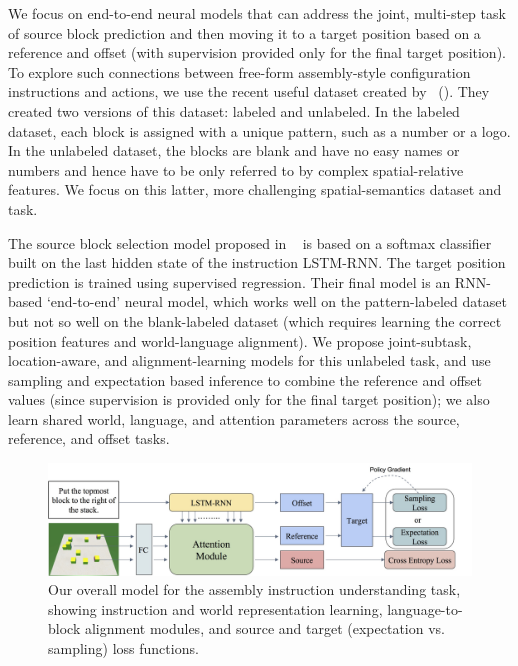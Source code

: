 \documentclass[letterpaper]{article} %
\newcommand{\newcite}[1]{\citeauthor{#1} (\citeyear{#1})}
\begin{document}
We focus on end-to-end neural models that can address the joint, multi-step task of source block prediction and then moving it to a target position based on a reference and offset (with supervision provided only for the final target position). To explore such connections between free-form assembly-style configuration instructions and  actions, we use the recent useful dataset created by~\newcite{bisk2016natural}. They created two versions of this dataset: labeled and unlabeled. In the labeled dataset, each block is assigned with a unique pattern, such as a number or a logo. In the unlabeled dataset, the blocks are blank and have no easy names or numbers and hence have to be only referred to by complex spatial-relative features. We focus on this latter, more challenging spatial-semantics dataset and task.

The source block selection model proposed in ~\cite{bisk2016natural} is based on a softmax classifier built on the last hidden state of the instruction LSTM-RNN. The target position prediction is trained using supervised regression.  Their final model is an RNN-based `end-to-end' neural model, which works well on the pattern-labeled dataset but not so well on the blank-labeled dataset (which requires learning the correct position features and world-language alignment). We propose joint-subtask, location-aware, and alignment-learning models for this unlabeled task, and use sampling and expectation based inference to combine the reference and offset values (since supervision is provided only for the final target position); we also learn shared world, language, and attention parameters across the source, reference, and offset tasks.

\begin{figure}
\centering
\includegraphics[width=0.98\linewidth]{Model_new.jpg}
\caption{Our overall model for the assembly instruction understanding task, showing instruction and world representation learning, language-to-block alignment modules, and source and target (expectation vs. sampling) loss functions.}
\label{fig:model}
\end{figure}
\end{document}
